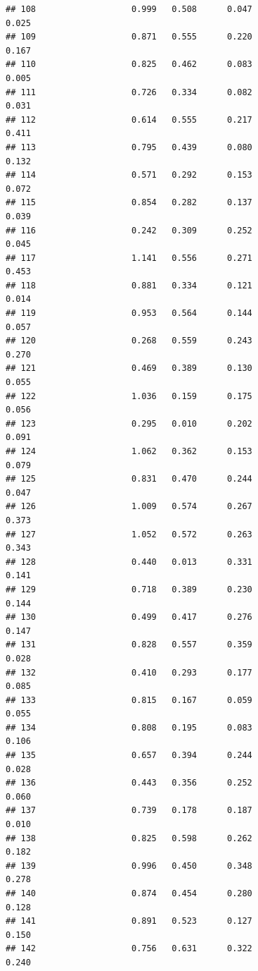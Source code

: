 \documentclass[]{article}
\begin{document}
\begin{verbatim}
## 108                   0.999   0.508      0.047                     0.025
## 109                   0.871   0.555      0.220                     0.167
## 110                   0.825   0.462      0.083                     0.005
## 111                   0.726   0.334      0.082                     0.031
## 112                   0.614   0.555      0.217                     0.411
## 113                   0.795   0.439      0.080                     0.132
## 114                   0.571   0.292      0.153                     0.072
## 115                   0.854   0.282      0.137                     0.039
## 116                   0.242   0.309      0.252                     0.045
## 117                   1.141   0.556      0.271                     0.453
## 118                   0.881   0.334      0.121                     0.014
## 119                   0.953   0.564      0.144                     0.057
## 120                   0.268   0.559      0.243                     0.270
## 121                   0.469   0.389      0.130                     0.055
## 122                   1.036   0.159      0.175                     0.056
## 123                   0.295   0.010      0.202                     0.091
## 124                   1.062   0.362      0.153                     0.079
## 125                   0.831   0.470      0.244                     0.047
## 126                   1.009   0.574      0.267                     0.373
## 127                   1.052   0.572      0.263                     0.343
## 128                   0.440   0.013      0.331                     0.141
## 129                   0.718   0.389      0.230                     0.144
## 130                   0.499   0.417      0.276                     0.147
## 131                   0.828   0.557      0.359                     0.028
## 132                   0.410   0.293      0.177                     0.085
## 133                   0.815   0.167      0.059                     0.055
## 134                   0.808   0.195      0.083                     0.106
## 135                   0.657   0.394      0.244                     0.028
## 136                   0.443   0.356      0.252                     0.060
## 137                   0.739   0.178      0.187                     0.010
## 138                   0.825   0.598      0.262                     0.182
## 139                   0.996   0.450      0.348                     0.278
## 140                   0.874   0.454      0.280                     0.128
## 141                   0.891   0.523      0.127                     0.150
## 142                   0.756   0.631      0.322                     0.240

\end{verbatim}
\end{document}
